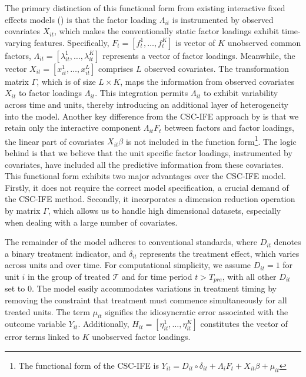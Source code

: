 \documentclass[12pt]{article}
\begin{document}
The primary distinction of this functional form from existing interactive fixed effects models (\cite{gobillon2016regional, chan2016policy}) is that the factor loading $\Lambda_{it}$ is instrumented by observed covariates $X_{it}$, which makes the conventionally static factor loadings exhibit time-varying features. Specifically, $F_t = [f_t^1, \ldots, f_t^K]$ is vector of $K$ unobserved common factors, $\Lambda_{it} = [\lambda_{it}^1, \ldots, \lambda_{it}^K]$ represents a vector of factor loadings. Meanwhile, the vector $X_{it} = [x_{it}^1, \ldots, x_{it}^L]$ comprises $L$ observed covariates. The transformation matrix $\Gamma$, which is of size $L \times K$, maps the information from observed covariates $X_{it}$ to factor loadings $\Lambda_{it}$. This integration permits $\Lambda_{it}$ to exhibit variability across time and units, thereby introducing an additional layer of heterogeneity into the model. Another key difference from the CSC-IFE approach by \cite{xu2017generalized} is that we retain only the interactive component $\Lambda_{it} F_t$ between factors and factor loadings, the linear part of covariates $X_{it}\beta$ is not included in the function form\footnote{The functional form of the CSC-IFE is $Y_{it} = D_{it} \circ \delta_{it} + \Lambda_{i}F_{t} + X_{it}\beta + \mu_{it}$}. The logic behind is that we believe that the unit specific factor loadings, instrumented by covariates, have included all the predictive information from these covariates. This functional form exhibits two major advantages over the CSC-IFE model. Firstly, it does not require the correct model specification, a crucial demand of the CSC-IFE method. Secondly, it incorporates a dimension reduction operation by matrix $\Gamma$, which allows us to handle high dimensional datasets, especially when dealing with a large number of covariates. 

The remainder of the model adheres to conventional standards, where $D_{it}$ denotes a binary treatment indicator, and $\delta_{it}$ represents the treatment effect, which varies across units and over time. For computational simplicity, we assume $D_{it} = 1$ for unit $i$ in the group of treated $\mathcal{T}$ and for time period $t > T_{pre}$, with all other $D_{it}$ set to $0$. The model easily accommodates variations in treatment timing by removing the constraint that treatment must commence simultaneously for all treated units. The term $\mu_{it}$ signifies the idiosyncratic error associated with the outcome variable $Y_{it}$. Additionally, $H_{it} = [\eta_{it}^1, \ldots, \eta_{it}^K]$ constitutes the vector of error terms linked to $K$ unobserved factor loadings.
\end{document}
